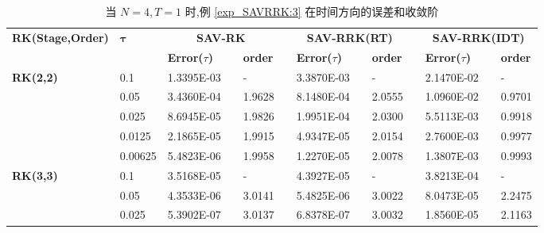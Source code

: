 \begin{table}[H]\scriptsize
\centering
\caption{当 $N=4, T = 1$ 时,例 \ref{exp_SAVRRK:3} 在时间方向的误差和收敛阶}
\begin{tabular}{lllllrlrlrlrlrl}
\toprule
\multicolumn{2}{l}{\multirow{2}[3]{*}{\textbf{RK(Stage,Order)}}} & \multicolumn{2}{l}{\multirow{2}[3]{*}{$\bm{\tau}$}} & \multicolumn{3}{c}{\textbf{SAV-RK}} &       & \multicolumn{3}{c}{\textbf{SAV-RRK(RT)}} &       & \multicolumn{3}{c}{\textbf{SAV-RRK(IDT)}} \\
\cmidrule{5-7}\cmidrule{9-11}\cmidrule{13-15}    \multicolumn{2}{l}{} & \multicolumn{2}{l}{} & \textbf{Error($\tau$)} &       & \textbf{order} &       & \textbf{Error($\tau$)} &       & \textbf{order} &       & \textbf{Error($\tau$)} &       & \textbf{order} \\
\hline
\multicolumn{2}{l}{\multirow{5}[0]{*}{\textbf{RK(2,2)}}} & \multicolumn{2}{l}{0.1} & 1.3395E-03 &       & -     &       & 3.3870E-03 &       & -     &       & 2.1470E-02 &       & - \\
\multicolumn{2}{l}{} & \multicolumn{2}{l}{0.05} & 3.4360E-04 &       & 1.9628  &       & 8.1480E-04 &       & 2.0555  &       & 1.0960E-02 &       & 0.9701  \\
\multicolumn{2}{l}{} & \multicolumn{2}{l}{0.025} & 8.6945E-05 &       & 1.9826  &       & 1.9951E-04 &       & 2.0300  &       & 5.5113E-03 &       & 0.9918  \\
\multicolumn{2}{l}{} & \multicolumn{2}{l}{0.0125} & 2.1865E-05 &       & 1.9915  &       & 4.9347E-05 &       & 2.0154  &       & 2.7600E-03 &       & 0.9977  \\
\multicolumn{2}{l}{} & \multicolumn{2}{l}{0.00625} & 5.4823E-06 &       & 1.9958  &       & 1.2270E-05 &       & 2.0078  &       & 1.3807E-03 &       & 0.9993  \\
\multicolumn{2}{l}{\multirow{5}[0]{*}{\textbf{RK(3,3)}}} & \multicolumn{2}{l}{0.1} & 3.5168E-05 &       & -     &       & 4.3927E-05 &       & -     &       & 3.8213E-04 &       & - \\
\multicolumn{2}{l}{} & \multicolumn{2}{l}{0.05} & 4.3533E-06 &       & 3.0141  &       & 5.4825E-06 &       & 3.0022  &       & 8.0473E-05 &       & 2.2475  \\
\multicolumn{2}{l}{} & \multicolumn{2}{l}{0.025} & 5.3902E-07 &       & 3.0137  &       & 6.8378E-07 &       & 3.0032  &       & 1.8560E-05 &       & 2.1163  \\

\end{tabular}
\end{table}
